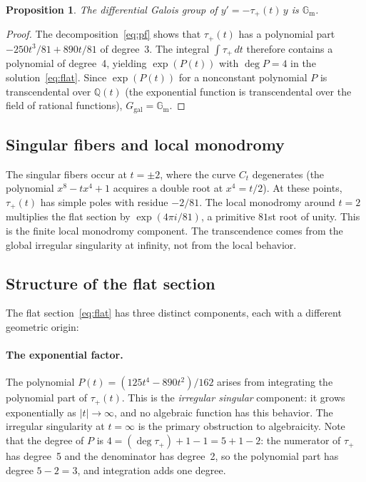 \documentclass[11pt]{article}
\theoremstyle{plain}
\newtheorem{proposition}[theorem]{Proposition}
\theoremstyle{definition}
\theoremstyle{remark}
\newcommand{\Q}{\mathbb{Q}}
\newcommand{\Ggal}{G_{\mathrm{gal}}}
\newcommand{\Gm}{\mathbb{G}_{\mathrm{m}}}
\begin{document}
\begin{proposition}\label{prop:galois}
The differential Galois group of $y' = -\tau_+(t)\, y$ is $\Gm$.
\end{proposition}

\begin{proof}
The decomposition~\eqref{eq:pf} shows that $\tau_+(t)$ has
a polynomial part $-250t^3/81 + 890t/81$ of degree~3.
The integral $\int \tau_+\, dt$ therefore contains a
polynomial of degree~4, yielding $\exp(P(t))$ with
$\deg P = 4$ in the solution~\eqref{eq:flat}. Since $\exp(P(t))$
for a nonconstant polynomial $P$ is transcendental over $\Q(t)$
(the exponential function is transcendental over the field of
rational functions), $\Ggal = \Gm$.
\end{proof}

\subsection{Singular fibers and local monodromy}

The singular fibers occur at $t = \pm 2$, where the curve $C_t$ degenerates
(the polynomial $x^8 - tx^4 + 1$ acquires a double root at $x^4 = t/2$).
At these points, $\tau_+(t)$ has simple poles with residue $-2/81$. The
local monodromy around $t = 2$ multiplies the flat section by
$\exp(4\pi i/81)$, a primitive $81$st root of unity. This is the finite
local monodromy component. The transcendence comes from the global
irregular singularity at infinity, not from the local behavior.

\subsection{Structure of the flat section}

The flat section~\eqref{eq:flat} has three distinct components, each
with a different geometric origin:

\paragraph{The exponential factor.}
The polynomial $P(t) = (125t^4 - 890t^2)/162$ arises from integrating
the polynomial part of $\tau_+(t)$. This is the \emph{irregular singular}
component: it grows exponentially as $|t| \to \infty$, and no algebraic
function has this behavior. The irregular singularity at $t = \infty$ is
the primary obstruction to algebraicity. Note that the degree of $P$ is
$4 = (\deg \tau_+) + 1 - 1 = 5 + 1 - 2$: the numerator of $\tau_+$
has degree~5 and the denominator has degree~2, so the polynomial part
has degree $5 - 2 = 3$, and integration adds one degree.
\end{document}
